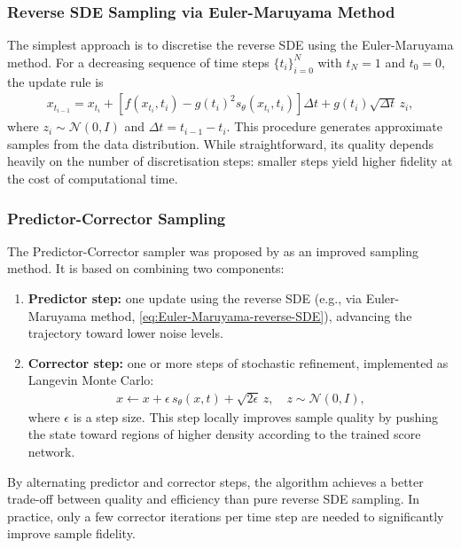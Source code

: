 \documentclass[a4paper,12pt]{article}
\begin{document}
\subsubsection{Reverse SDE Sampling via Euler-Maruyama Method}
The simplest approach is to discretise the reverse SDE using the Euler-Maruyama method. For a decreasing sequence of time steps \(\{t_i\}_{i=0}^N\) with \(t_N = 1\) and \(t_0 = 0\), the update rule is
\begin{align}\label{eq:Euler-Maruyama-reverse-SDE}
    x_{t_{i-1}} = x_{t_i} + \left[f(x_{t_i},t_i) - g(t_i)^2 s_\theta(x_{t_i},t_i)\right]\Delta t + g(t_i)\sqrt{\Delta t}\,z_i,
\end{align}
where \(z_i \sim \mathcal{N}(0,I)\) and \(\Delta t = t_{i-1} - t_i\). This procedure generates approximate samples from the data distribution. While straightforward, its quality depends heavily on the number of discretisation steps: smaller steps yield higher fidelity at the cost of computational time.

\subsubsection{Predictor-Corrector Sampling}\label{sec:PC-sampling}
The Predictor-Corrector sampler was proposed by \citet{song2021ScoreBasedGenerativeModeling} as an improved sampling method. It is based on combining two components:
\begin{enumerate}
    \item \textbf{Predictor step:} one update using the reverse SDE (e.g., via Euler-Maruyama method, \cref{eq:Euler-Maruyama-reverse-SDE}), advancing the trajectory toward lower noise levels.
    \item \textbf{Corrector step:} one or more steps of stochastic refinement, implemented as Langevin Monte Carlo:
        \begin{align*}
            x \leftarrow x + \epsilon\, s_\theta(x,t) + \sqrt{2\epsilon}\,z, \quad z \sim \mathcal{N}(0,I),
        \end{align*}
        where \(\epsilon\) is a step size. This step locally improves sample quality by pushing the state toward regions of higher density according to the trained score network.
\end{enumerate}
By alternating predictor and corrector steps, the algorithm achieves a better trade-off between quality and efficiency than pure reverse SDE sampling. 
In practice, only a few corrector iterations per time step are needed to significantly improve sample fidelity.
\end{document}
